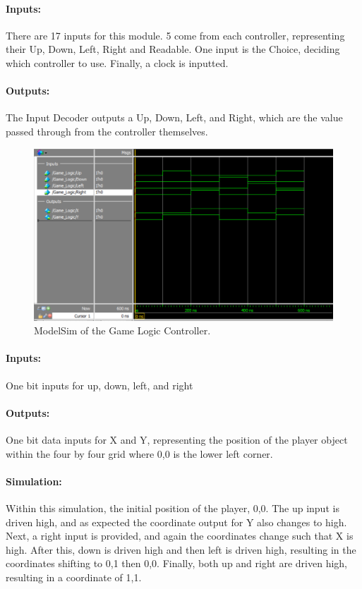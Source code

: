 \documentclass[]{article}
\begin{document}
\paragraph{Inputs:} There are 17 inputs for this module. 5 come from each controller, representing their Up, Down, Left, Right and Readable.
One input is the Choice, deciding which controller to use. Finally, a clock is inputted.
\paragraph{Outputs:} The Input Decoder outputs a Up, Down, Left, and Right, which are the value passed through from the controller themselves.
\begin{figure}[H]\centering
	\includegraphics[width=\linewidth]{figures/Game_Logic_ModelSim.png}
    \caption{ModelSim of the Game Logic Controller.}
\end{figure}
\paragraph{Inputs:} One bit inputs for up, down, left, and right
\paragraph{Outputs:} One bit data inputs for X and Y, representing the position of the player object within the four by four grid where 0,0 is the lower left corner.
\paragraph{Simulation:} Within this simulation, the initial position of the player, 0,0. The up input is driven high, and as expected the coordinate output for Y also changes to high.
Next, a right input is provided, and again the coordinates change such that X is high. After this, down is driven high and then left is driven high,
resulting in the coordinates shifting to 0,1 then 0,0. Finally, both up and right are driven high, resulting in a coordinate of 1,1.
\end{document}
